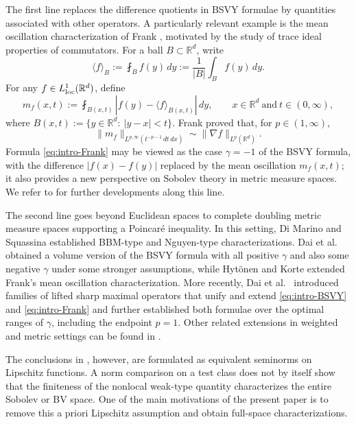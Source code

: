 \documentclass[11pt]{amsart}
\theoremstyle{definition}
\theoremstyle{remark}
\numberwithin{equation}{section}
\begin{document}
The first line replaces the difference quotients in BSVY formulae by
quantities associated with other operators.  A particularly relevant example
is the mean oscillation characterization of Frank \cite{Frank:W1p},
motivated by the study of trace ideal properties of commutators.  For a ball
$B\subset\mathbb R^d$, write
\begin{equation*}
 \langle f\rangle_B:=\fint_B f(y)\,dy
 :=\frac{1}{|B|}\int_B f(y)\,dy.
\end{equation*}
For any $f\in L^1_{\rm loc}(\mathbb R^d)$, define
\begin{equation*}
 m_f(x,t):=\fint_{B(x,t)}|f(y)-\langle f\rangle_{B(x,t)}|\,dy,
\qquad x\in\mathbb R^d\ \text{and}\ t\in(0,\infty),
\end{equation*}
where $B(x,t):=\{y\in\mathbb R^d:\ |y-x|<t\}$.
Frank \cite{Frank:W1p} proved that, for $p\in(1,\infty)$,
\begin{equation}\label{eq:intro-Frank}
 \|m_f\|_{L^{p,\infty}(t^{-p-1}\,dt\,dx)}
 \sim \|\nabla f\|_{L^p(\mathbb R^d)}.
\end{equation}
Formula \eqref{eq:intro-Frank} may be viewed as the case $\gamma=-1$ of the
BSVY formula, with the difference $|f(x)-f(y)|$ replaced by the mean
oscillation $m_f(x,t)$; it also provides a new perspective on Sobolev theory
in metric measure spaces.
We refer to \cite{DominguezMilman22,DSSVY23,
DLYYZ:LiftedHL} for further developments along this
line.

The second line goes beyond Euclidean spaces to complete doubling metric measure
spaces supporting a Poincar\'e inequality.  In this setting, Di Marino and
Squassina \cite{DMS} established BBM-type and Nguyen-type characterizations.  Dai et
al.\ \cite{DLYYZ:JFA} obtained a volume version of the BSVY formula with all positive
$\gamma$ and also some negative $\gamma$ under some stronger assumptions, while
Hyt\"onen and Korte \cite{HK:W1p} extended Frank's mean oscillation
characterization.  More recently, Dai et al.\ \cite{DLYYZ} introduced families
of lifted sharp maximal operators that unify and extend \eqref{eq:intro-BSVY} and
\eqref{eq:intro-Frank} and further established both formulae
over the optimal ranges of $\gamma$, including the endpoint
$p=1$.  Other related extensions in weighted and metric settings can be found
in \cite{Munnier,DLYYZ:CVPDE,ZYY23,ZLYYZ24}.

The conclusions in \cite{DLYYZ}, however, are formulated as equivalent
seminorms on Lipschitz functions.  A norm comparison on a test class does
not by itself show that the finiteness of the nonlocal weak-type quantity
characterizes the entire Sobolev or BV space.  One of the main motivations of
the present paper is to remove this a priori Lipschitz assumption and obtain
full-space characterizations.
\end{document}
